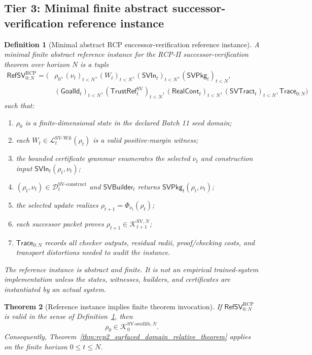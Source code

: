 \documentclass[11pt]{article}
\newtheorem{theorem}{Theorem}[section]
\newtheorem{definition}[theorem]{Definition}
\newcommand{\Lcal}{\mathcal{L}}
\newcommand{\1}{\mathbf{1}}
\newcommand{\RCP}{\mathrm{RCP}}
\providecommand{\Dcal}{\mathcal{D}}
\providecommand{\Kcal}{\mathcal{K}}
\begin{document}
\subsection{Tier 3: Minimal finite abstract successor-verification reference instance}

\begin{definition}[Minimal abstract RCP successor-verification reference instance]
\label{def:rcp2_minimal_sv_reference_instance}
A minimal finite abstract reference instance for the RCP-II successor-verification theorem over horizon \(N\) is a tuple
\[
\begin{aligned}
\mathsf{RefSV}_{0:N}^{\RCP}=
(&\rho_0, (\nu_t)_{t<N},(W_t)_{t<N},
(\mathsf{SVIn}_t)_{t<N},(\mathsf{SVPkg}_t)_{t<N},\\
&(\mathsf{GoalId}_t)_{t<N},(\mathsf{TrustRef}_t^{\mathrm{SV}})_{t<N},
(\mathsf{RealCont}_t)_{t<N},(\mathsf{SVTract}_t)_{t<N},
\mathsf{Trace}_{0:N})
\end{aligned}
\]
such that:
\begin{enumerate}[label=(\roman*),leftmargin=1.5em]
    \item \(\rho_0\) is a finite-dimensional state in the declared Batch 11 seed domain;
    \item each \(W_t\in\Lcal_t^{\mathrm{SV\mbox{-}Wit}}(\rho_t)\) is a valid positive-margin witness;
    \item the bounded certificate grammar enumerates the selected \(\nu_t\) and construction input \(\mathsf{SVIn}_t(\rho_t,\nu_t)\);
    \item \((\rho_t,\nu_t)\in\Dcal_t^{\mathrm{SV\mbox{-}construct}}\) and \(\mathsf{SVBuilder}_t\) returns \(\mathsf{SVPkg}_t(\rho_t,\nu_t)\);
    \item the selected update realizes \(\rho_{t+1}=\Phi_{\nu_t}(\rho_t)\);
    \item each successor packet proves \(\rho_{t+1}\in\Kcal_{t+1}^{\mathrm{SV},N}\);
    \item \(\mathsf{Trace}_{0:N}\) records all checker outputs, residual radii, proof/checking costs, and transport distortions needed to audit the instance.
\end{enumerate}
The reference instance is abstract and finite. It is not an empirical trained-system implementation unless the states, witnesses, builders, and certificates are instantiated by an actual system.
\end{definition}

\begin{theorem}[Reference instance implies finite theorem invocation]
\label{thm:rcp2_reference_instance_invokes_finite_theorem}
If \(\mathsf{RefSV}_{0:N}^{\RCP}\) is valid in the sense of Definition~\ref{def:rcp2_minimal_sv_reference_instance}, then
\[
\rho_0\in\Kcal_0^{\mathrm{SV\mbox{-}seedlib},N}.
\]
Consequently, Theorem~\ref{thm:rcp2_surfaced_domain_relative_theorem} applies on the finite horizon \(0\le t\le N\).
\end{theorem}
\end{document}
